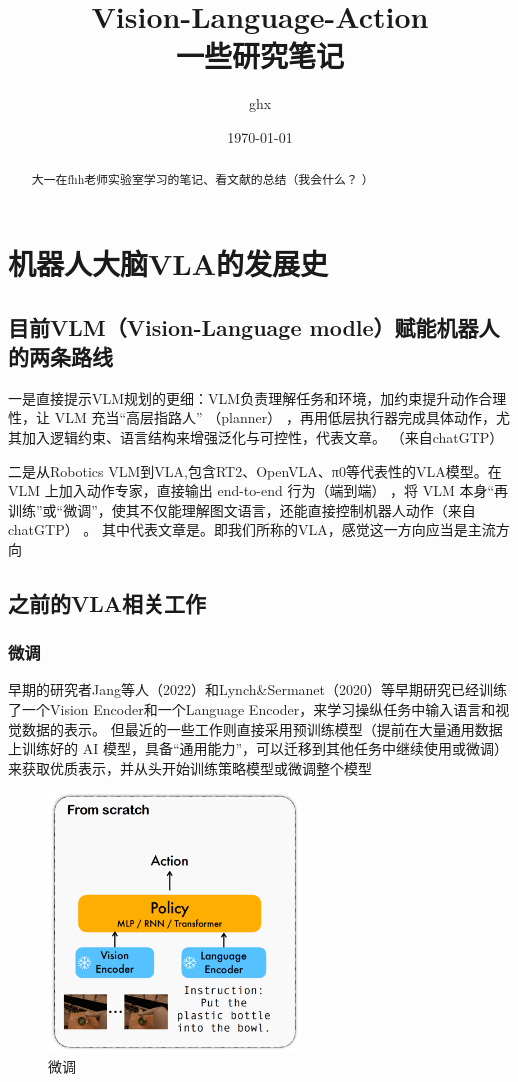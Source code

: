 \documentclass[12pt]{article}
\title{Vision-Language-Action \\ \large 一些研究笔记}
\author{ghx \quad \\}
\date{\today}
\begin{document}
\maketitle

\begin{abstract}
大一在fhh老师实验室学习的笔记、看文献的总结（我会什么？ ）
\end{abstract}

\section{机器人大脑VLA的发展史\cite{vla_history_csdn}}

\subsection{目前VLM（Vision-Language modle）赋能机器人的两条路线}
一是直接提示VLM规划的更细：VLM负责理解任务和环境，加约束提升动作合理性，让 VLM 充当“高层指路人” （planner） ，再用低层执行器完成具体动作，尤其加入逻辑约束、语言结构来增强泛化与可控性，代表文章\cite{vlm_constrained_planning}。 （来自chatGTP）

二是从Robotics VLM到VLA,包含RT2、OpenVLA、π0等代表性的VLA模型。在 VLM 上加入动作专家，直接输出 end-to-end 行为（端到端） ，将 VLM 本身“再训练”或“微调”，使其不仅能理解图文语言，还能直接控制机器人动作（来自chatGTP） 。
其中代表文章是\cite{vla_history_csdn}。即我们所称的VLA，感觉这一方向应当是主流方向

\subsection{之前的VLA相关工作}

\subsubsection{微调}
早期的研究者Jang等人（2022）和Lynch\&Sermanet（2020）等早期研究已经训练了一个Vision Encoder和一个Language Encoder，来学习操纵任务中输入语言和视觉数据的表示。
但最近的一些工作则直接采用预训练模型（提前在大量通用数据上训练好的 AI 模型，具备“通用能力”，可以迁移到其他任务中继续使用或微调）来获取优质表示，并从头开始训练策略模型或微调整个模型

\begin{figure}[ht]  %
\centering
\includegraphics[width=0.6\textwidth]{pic1.png}
\caption{微调}
\end{figure}
\end{document}
